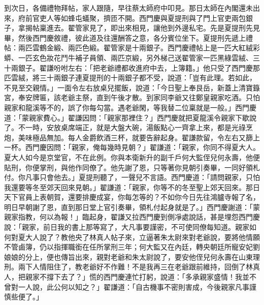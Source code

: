 到次日，各備禮物拜帖，家人跟隨，早往蔡太師府中叩見。那日太師在內閣還未出來，府前官吏人等如蜂屯蟻聚，擠匝不開。西門慶與夏提刑與了門上官吏兩包銀子，拿揭帖稟進去。翟管家見了，即出來相見，讓他到外邊私宅。先是夏提刑先見畢，然後西門慶敘禮，彼此道及往還酬答之意，各分賓位坐下。夏提刑先遞上禮帖：兩匹雲鶴金緞、兩匹色緞。翟管家是十兩銀子。西門慶禮帖上是一匹大紅絨彩蟒、一匹玄色妝花鬥牛補子員領、兩匹京緞，另外梯己送翟管家一匹黑綠雲絨、三十兩銀子。翟謙吩咐左右：「把老爺禮都收進府中去，上簿籍。」他只受了西門慶那匹雲絨，將三十兩銀子連夏提刑的十兩銀子都不受，說道：「豈有此理。若如此，不見至交親情。」一面令左右放桌兒擺飯，說道：「今日聖上奉艮岳，新蓋上清寶籙宮，奉安牌匾，該老爺主祭，直到午後才散。到家同李爺又往鄭皇親家吃酒。只怕親家和龍溪等不的，誤了你每勾當。遇老爺閑，等我替二位稟就是一般。」西門慶道：「蒙親家費心。」翟謙因問：「親家那裡住？」西門慶就把夏龍溪令親家下歇說了。不一時，安放桌席端正，就是大盤大碗，湯飯點心一齊拿上來，都是光祿烹炮，美味極品無加。每人金爵飲酒三杯，就要告辭起身。翟謙款留，令左右又篩上一杯。西門慶因問：「親家，俺每幾時見朝？」翟謙道：「親家，你同不得夏大人。夏大人如今是京堂官，不在此例。你與本衛新升的副千戶何大監侄兒何永壽，他便貼刑，你便掌刑，與他作同僚了。他先謝了恩，只等著你見朝引奏畢，一同好領札付。你凡事只會他去。」夏提刑聽了，一聲兒不言語。西門慶道：「請問親家，只怕我還要等冬至郊天回來見朝。」翟謙道：「親家，你等不的冬至聖上郊天回來。那日天下官員上表朝賀，還要排慶成宴，你每怎等的？不如你今日先往鴻臚寺報了名，明日早朝謝了恩，直到那日堂上官引奏畢，領札付起身就是了。」西門慶謝道：「蒙親家指教，何以為報！」臨起身，翟謙又拉西門慶到側凈處說話，甚是埋怨西門慶說：「親家，前日我的書上那等寫了，大凡事要謹密，不可使同僚每知道。親家如何對夏大人說了？教他央了林真人帖子來，立逼著朱太尉來對老爺說，要將他情願不管鹵簿，仍以指揮職銜在任所掌刑三年；何大監又在內廷，轉央朝廷所寵安妃劉娘娘的分上，便也傳旨出來，親對老爺和朱太尉說了，要安他侄兒何永壽在山東理刑。兩下人情阻住了，教老爺好不作難！不是我再三在老爺跟前維持，回倒了林真人，把親家不撐下去了？」慌的西門慶連忙打躬，說道：「多承親家盛情！我並不曾對一人說，此公何以知之？」翟謙道：「自古機事不密則害成，今後親家凡事謹慎些便了。」

